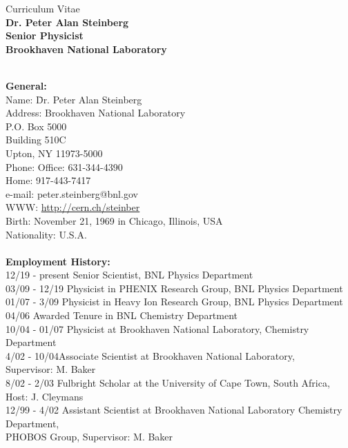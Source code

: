 \documentclass[11 pt]{article}
\begin{document}
\newcommand{\snn}{\sqrt{s_{NN}}}
\begin{center}
Curriculum Vitae \\
{\bf Dr. Peter Alan Steinberg}\\
{\bf Senior Physicist}\\
{\bf Brookhaven National Laboratory}\\
\end{center}

\begin{tabbing}
\\
{\bf General:}\\
Name: \hspace{2cm} \= Dr. Peter Alan Steinberg \\
Address: \> Brookhaven National Laboratory\\  
        \> P.O. Box 5000\\
        \> Building 510C \\
        \> Upton, NY 11973-5000 \\
Phone: \> Office: 631-344-4390 \\
       \> Home:   917-443-7417\\
e-mail: \> peter.steinberg@bnl.gov \\
WWW: \> \url{http://cern.ch/steinber} \\
Birth: \> November 21, 1969 in Chicago, Illinois, USA \\
Nationality: \> U.S.A. \\
\\
\textbf{Employment History:}\\
12/19 - present \> Senior Scientist, BNL Physics Department\\
03/09 - 12/19 \> Physicist in PHENIX Research Group, BNL Physics Department  \\
01/07 - 3/09 \> Physicist in Heavy Ion Research Group, BNL Physics Department  \\
04/06 \> Awarded Tenure in BNL Chemistry Department\\
10/04 - 01/07 \>Physicist at Brookhaven National Laboratory, Chemistry Department\\
4/02 - 10/04\>Associate Scientist at Brookhaven National Laboratory,\\ \> Supervisor: M. Baker\\
8/02 - 2/03\> Fulbright Scholar at the University of Cape Town, South Africa, Host: J. Cleymans\\
12/99 - 4/02 \>Assistant Scientist at Brookhaven National Laboratory Chemistry Department,\\ \> PHOBOS Group, Supervisor: M. Baker\\

\end{tabbing}
\end{document}
